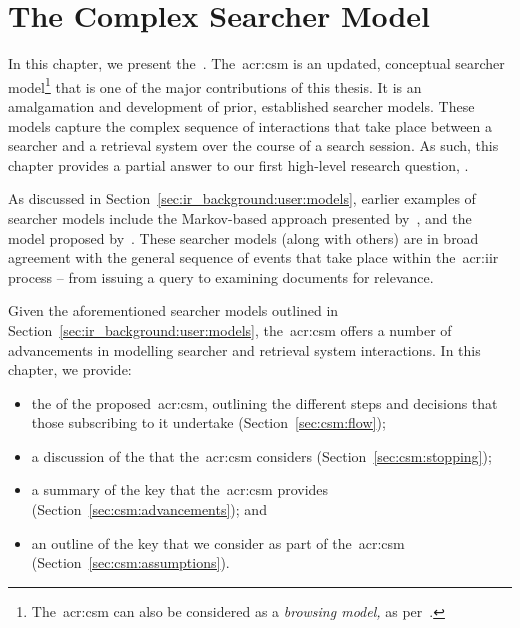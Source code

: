 
\chapter[The Complex Searcher Model]{The Complex Searcher Model}\label{chap:csm}
In this chapter, we present the~. The~\gls{acr:csm} is an updated, conceptual searcher model\footnote{The~\gls{acr:csm} can also be considered as a \emph{browsing model,} as per~\cite{carterette2011effectiveness_evaluation}.} that is one of the major contributions of this thesis. It is an amalgamation and development of prior, established searcher models. These models capture the complex sequence of interactions that take place between a searcher and a retrieval system over the course of a search session. As such, this chapter provides a partial answer to our first high-level research question, .

\begin{figure}[h]
    \centering
    \vspace{4mm}
    \label{fig:model_example}
    \vspace{-5mm}
\end{figure}

As discussed in Section~\ref{sec:ir_background:user:models}, earlier examples of searcher models include the Markov-based approach presented by~\cite{baskaya2013behavioural_factors}, and the model proposed by~\cite{thomas2014modelling_behaviour}. These searcher models (along with others) are in broad agreement with the general sequence of events that take place within the~\gls{acr:iir} process -- from issuing a query to examining documents for relevance.

Given the aforementioned searcher models outlined in Section~\ref{sec:ir_background:user:models}, the~\gls{acr:csm} offers a number of advancements in modelling searcher and retrieval system interactions. In this chapter, we provide:

\begin{itemize}
    \item{the  of the proposed~\gls{acr:csm}, outlining the different steps and decisions that those subscribing to it undertake (Section~\ref{sec:csm:flow});}
    \item{a discussion of the  that the~\gls{acr:csm} considers (Section~\ref{sec:csm:stopping});}
    \item{a summary of the key  that the~\gls{acr:csm} provides (Section~\ref{sec:csm:advancements}); and}
    \item{an outline of the key  that we consider as part of the~\gls{acr:csm} (Section~\ref{sec:csm:assumptions}).}
\end{itemize}

